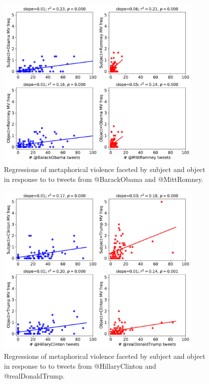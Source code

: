 \begin{figure}[H]
  \centering
    \includegraphics[width=0.9\textwidth]{Figures/2012-subjobj.pdf}
  \caption{Regressions of metaphorical violence faceted by subject and object
    in response to to tweets from @BarackObama and @MittRomney.}
  \label{fig:2012-subjobj}
\end{figure}


\begin{figure}[H]
  \centering
    \includegraphics[width=0.9\textwidth]{Figures/2016-subjobj.pdf}
  \caption{Regressions of metaphorical violence faceted by subject and object
    in response to to tweets from @HillaryClinton and @realDonaldTrump.}
  \label{fig:2016-subjobj}
\end{figure}

